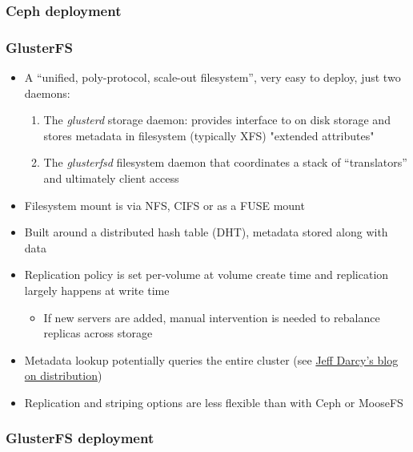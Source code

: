 \documentclass[handout]{beamer}
\begin{document}
\begin{frame}
\frametitle{Ceph deployment}
\end{frame}

\begin{frame}
\frametitle{GlusterFS}
\begin{itemize}
\item A ``unified, poly-protocol, scale-out filesystem'', very easy to deploy, just two daemons:
\begin{enumerate}
\item The \emph{glusterd} storage daemon: provides interface to on disk storage and stores metadata in filesystem (typically XFS) "extended attributes"
\item The \emph{glusterfsd} filesystem daemon that coordinates a stack of ``translators'' and ultimately client access
\end{enumerate}
\item Filesystem mount is via NFS, CIFS or as a FUSE mount
\item Built around a distributed hash table (DHT), metadata stored along with data
\pause
\item Replication policy is set per-volume at volume create time and replication largely happens at write time
\begin{itemize}
\item If new servers are added, manual intervention is needed to rebalance replicas across storage
\end{itemize}
\item \small{Metadata lookup potentially queries the entire cluster (see \href{https://web.archive.org/web/20140325114833/http://hekafs.org/index.php/2012/03/glusterfs-algorithms-distribution/}{Jeff Darcy's blog on distribution})}
\item Replication and striping options are less flexible than with Ceph or MooseFS
\end{itemize}
\end{frame}

\begin{frame}
\frametitle{GlusterFS deployment}
\end{frame}
\end{document}
